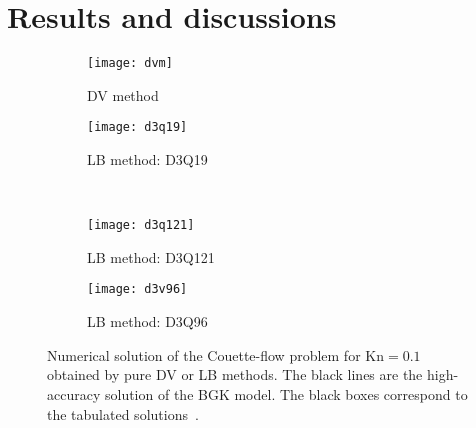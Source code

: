 \documentclass[]{elsarticle} %
\newcommand{\Kn}{\mathrm{Kn}}
\begin{document}
{\section{Results and discussions}\label{sec:results}

\begin{figure}
    \centering
    \begin{subfigure}[b]{0.5\textwidth}
        \texttt{[image: dvm]}
        \caption{DV method}
        \label{fig:dvm}
    \end{subfigure}%
    \begin{subfigure}[b]{0.5\textwidth}
        \texttt{[image: d3q19]}
        \caption{LB method: D3Q19}
        \label{fig:d3q19}
    \end{subfigure}\\
    \begin{subfigure}[b]{0.5\textwidth}
        \texttt{[image: d3q121]}
        \caption{LB method: D3Q121}
        \label{fig:d3q121}
    \end{subfigure}%
    \begin{subfigure}[b]{0.5\textwidth}
        \texttt{[image: d3v96]}
        \caption{LB method: D3Q96}
        \label{fig:d3q96}
    \end{subfigure}
    \caption{
        Numerical solution of the Couette-flow problem for $\Kn=0.1$ obtained by pure DV or LB methods.
        The black lines are the high-accuracy solution of the BGK model.
        The black boxes correspond to the tabulated solutions~\cite{Luo2015, Luo2016}.
    }\label{fig:pure}
\end{figure}

}
\end{document}

